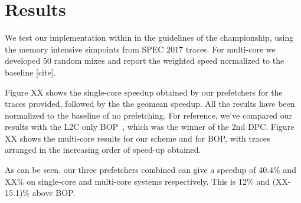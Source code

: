 \section{Results}
\label{Results}

We test our implementation within in the guidelines of the championship, using the
memory intensive simpoints from SPEC 2017 traces. For multi-core we developed 50
random mixes and report the weighted speed normalized to the baseline [cite].

Figure XX shows the single-core speedup obtained by our prefetchers for the traces 
provided, followed by the the geomean speedup. All the results have
been normalized to the baseline of no prefetching. For reference, we've compared
our results with the L2C only BOP~\cite{BOP}, which was the winner of the 2nd DPC.
Figure XX shows the multi-core results for our scheme and for BOP, with traces 
arranged in the increasing order of speed-up obtained.

As can be seen, our three prefetchers combined can give a speedup of 40.4\% and XX\%
on single-core and multi-core systems respectively. This is 12\% and (XX-15.1)\% above BOP.
